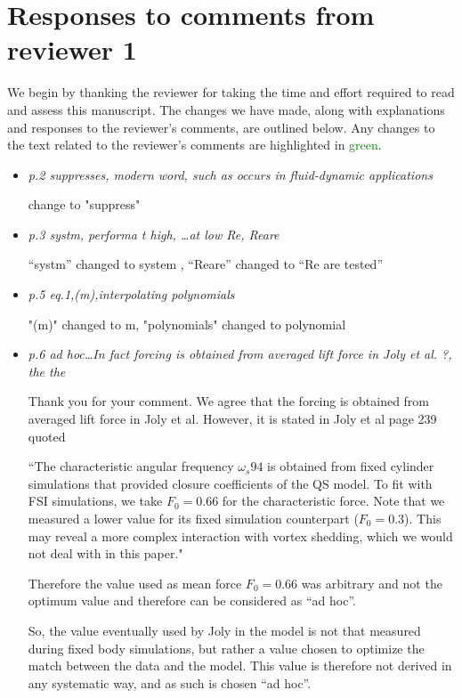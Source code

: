 \documentclass[]{article}
\begin{document}
\section*{Responses to comments from reviewer 1}

We begin by thanking the reviewer for taking the time and effort
required to read and assess this manuscript. The changes we have made, along with explanations and
responses to the reviewer's comments, are outlined below. Any changes to the text related to the reviewer's comments are highlighted in
\textcolor{green}{green}.

\begin{itemize}
\item \emph{p.2	suppresses,	modern word, such as occurs in fluid-dynamic applications}

change to "suppress"

\item \emph{p.3	systm,	performa	t high,	…at	low	Re,	Reare}

“systm” changed to system , “Reare” changed to “Re are tested”  

\item \emph{p.5	eq.1,(m),interpolating polynomials}

"(m)" changed to m, "polynomials" changed to polynomial

\item \emph{p.6	ad hoc…In fact forcing is obtained from	averaged lift force	in Joly et al. ?, the the}

Thank you for your comment. We agree that the forcing is obtained from averaged lift force in Joly et al. However, it is stated in Joly et al  page 239 quoted 

``The characteristic angular frequency $\omega_{s}94$ is obtained from fixed cylinder simulations that provided closure coefficients of the QS model. To fit with FSI simulations, we take $F_0=0.66$ for the characteristic force. Note that we measured a lower value for its fixed simulation counterpart ($F_0=0.3$). This may reveal a more complex interaction with vortex shedding, which we would not deal with in this paper."

Therefore the value used as mean force $F_0= 0.66$ was arbitrary and not the optimum value and therefore can be considered as “ad hoc”.

So, the value eventually used by Joly in the model is not that measured during fixed body simulations, but rather a value chosen to optimize the match between the data and the model. This value is therefore not derived in any systematic way, and as such is chosen “ad hoc”.


\end{itemize}
\end{document}
